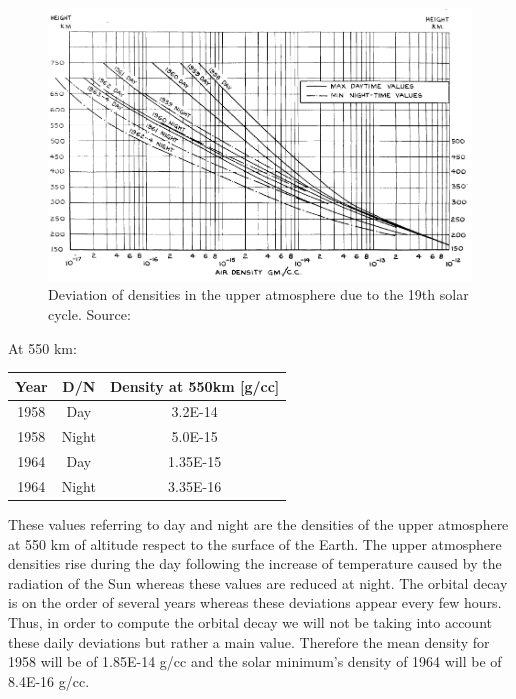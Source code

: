 \documentclass{article}
\begin{document}
\begin{figure}[h]
\includegraphics[width=14cm]{solarcycles}
\centering
\caption{Deviation of densities in the upper atmosphere due to the 19th solar cycle. Source: \cite{Priester1967}}
\end{figure}


At 550 km:

\begin{center}
 \begin{tabular}{||c| c| c||} 
 \hline\hline
Year & D/N & Density at 550km [g/cc]\\ [1ex] 
 \hline
 1958 & Day & 3.2E-14 \\ [1ex]
 \hline
 1958 & Night & 5.0E-15\\[1ex]
 \hline
 1964 & Day & 1.35E-15 \\[1ex]
 \hline
 1964 & Night & 3.35E-16 \\[1ex]
 \hline\hline
%
\end{tabular}
\caption{Density values at solar maximum and minimum of the cycle}
\end{center}

These values referring to day and night are the densities of the upper atmosphere at 550 km of altitude respect to the surface of the Earth. The upper atmosphere densities rise during the day following the increase of temperature caused by the radiation of the Sun whereas these values are reduced at night. The orbital decay is on the order of several years whereas these deviations appear every few hours. Thus, in order to compute the orbital decay we will not be taking into account these daily deviations but rather a main value. Therefore the mean density for 1958 will be of 1.85E-14 g/cc and the solar minimum's density of 1964 will be of 8.4E-16 g/cc. \\
\end{document}
